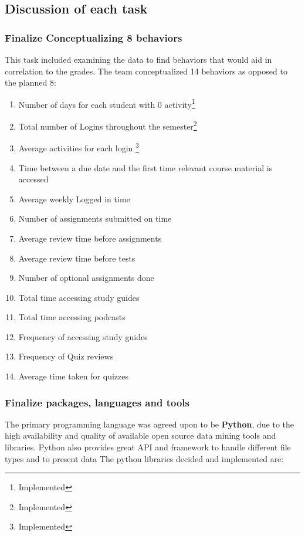 \documentclass[12pt]{article}
\begin{document}
	\subsection{Discussion of each task}
		\subsubsection{Finalize Conceptualizing 8 behaviors}
		This task included examining the data to find behaviors that would aid in correlation to the grades. The team conceptualized 14 behaviors as opposed to the planned 8:
		\begin{enumerate}
			\item Number of days for each student with 0 activity\footnote{Implemented}
			\item Total number of Logins throughout the semester\footnote{Implemented}
			\item Average activities for each login \footnote{Implemented}
			\item Time between a due date and the first time relevant course material is accessed
			\item Average weekly Logged in time
			\item Number of assignments submitted on time
			\item Average review time before assignments
			\item Average review time before tests
			\item Number of optional assignments done
			\item Total time accessing study guides
			\item Total time accessing podcasts
			\item Frequency of accessing study guides
			\item Frequency of Quiz reviews
			\item Average time taken for quizzes
		\end{enumerate}
		
		\subsubsection{Finalize packages, languages and tools}
		The primary programming language was agreed upon to be \textbf{Python}, due to the high availability and quality
		of available open source data mining tools and libraries. Python also provides great API and framework to handle different file types and to present data
		The python libraries decided and implemented are:
		
\end{document}
